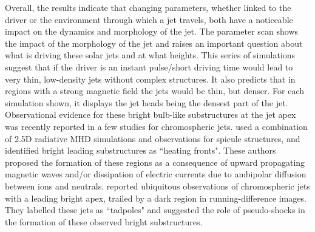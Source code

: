 Overall, the results indicate that changing parameters, whether linked to the driver or the environment through which a jet travels, both have a noticeable impact on the dynamics and morphology of the jet. The parameter scan shows the impact of the morphology of the jet and raises an important question about what is driving these solar jets and at what heights. This series of simulations suggest that if the driver is an instant pulse/short driving time would lead to very thin, low-density jets without complex structures. It also predicts that in regions with a strong magnetic field the jets would be thin, but denser. For each simulation shown, it displays the jet heads being the densest part of the jet. Observational evidence for these bright bulb-like substructures at the jet apex was recently reported in a few studies \citep{depontieu2017, srivastava2018NatAs} for chromospheric jets. \citet{depontieu2017} used a combination of 2.5D radiative MHD simulations and observations for spicule structures, and identified bright leading substructures as ``heating fronts". These authors proposed the formation of these regions as a consequence of upward propagating magnetic waves and/or dissipation of electric currents due to ambipolar diffusion between ions and neutrals. \citet{srivastava2018NatAs} reported ubiquitous observations of chromospheric jets with a leading bright apex, trailed by a dark region in running-difference images. They labelled these jets as ``tadpoles" and suggested the role of pseudo-shocks in the formation of these observed bright substructures.

